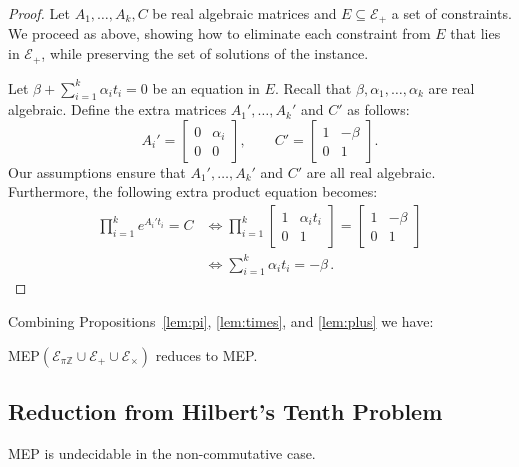 \begin{proof}
  Let $A_1,\ldots,A_k,C$ be real algebraic matrices and
  $E \subseteq\mathcal{E}_{+}$ a set of constraints.
  We proceed as above, showing how to eliminate each constraint from
  $E$ that lies in $\mathcal{E}_{+}$, while preserving the set of
  solutions of the instance.

Let $\beta+\sum_{i=1}^k\alpha_it_i=0$ be an equation in $E$.
Recall that $\beta,\alpha_1,\ldots,\alpha_k$ are real algebraic.
Define the extra matrices $A_1',\ldots,A_k'$ and $C'$ as follows:
\[A_i'=\begin{bmatrix}0&\alpha_i\\0&0\end{bmatrix},
\qquad C'=\begin{bmatrix}1&-\beta\\0&1\end{bmatrix}.\]
Our assumptions ensure that $A_1',\ldots,A_k'$ and $C'$ are all real algebraic.
Furthermore, the following extra product equation becomes:
\begin{align*}
\prod_{i=1}^ke^{A_i't_i}=C
&\Leftrightarrow\prod_{i=1}^k\begin{bmatrix}1&\alpha_it_i\\0&1\end{bmatrix}=\begin{bmatrix}1&-\beta\\0&1\end{bmatrix}\\
&\Leftrightarrow\sum_{i=1}^k\alpha_it_i=-\beta \, .
\end{align*}
\end{proof}

Combining Propositions~\ref{lem:pi}, \ref{lem:times}, and \ref{lem:plus} we
have:
\begin{proposition}
  MEP$(\mathcal{E}_{\pi\mathbb{Z}}\cup\mathcal{E}_{+}\cup\mathcal{E}_{\times})$
  reduces to MEP.
\end{proposition}

\subsection{Reduction from Hilbert's Tenth Problem}

\begin{theorem}
  MEP is undecidable in the non-commutative case.
\end{theorem}

